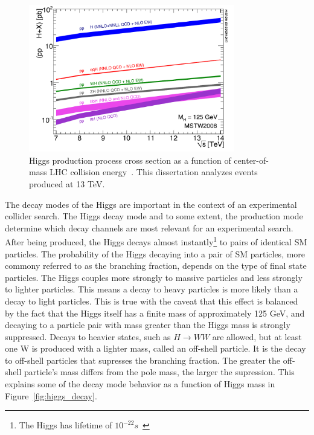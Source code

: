 \begin{figure}[hbtp]
 \begin{center}
   \includegraphics[width=0.8\textwidth]{ch2_figs/higgs_prod_xsec.pdf}
   \caption{Higgs production process cross section as a function of center-of-mass LHC collision energy~\cite{lhchxswg}.
     This dissertation analyzes events produced at 13 TeV.}
   \label{fig:higgs_prod_plot}
 \end{center}
\end{figure}


The decay modes of the Higgs are important in the context of an experimental collider search. The Higgs decay mode and to some extent, the production mode
determine which decay channels are most relevant for an experimental search. After being produced, the Higgs decays almost instantly\footnote{
The Higgs has lifetime of $10^{-22}s$~\cite{pdg}} to pairs of identical SM particles. The probability of the Higgs decaying into a pair of SM particles,
more commony referred to as the branching fraction, depends
on the type of final state particles. The Higgs couples more strongly to massive particles and less strongly to lighter particles. This means a decay to heavy
particles is more likely than a decay to light particles. This is true with the caveat that this effect is balanced by the fact that the Higgs itself has a
finite mass of approximately 125 GeV, and decaying to a particle pair with mass greater than the Higgs mass is strongly suppressed. Decays to heavier
states, such as $H\rightarrow WW$ are allowed, but at least one W is produced with a lighter mass, called an off-shell particle. It is the decay to off-shell
particles that supresses the branching fraction. The greater the off-shell particle's mass differs from the pole mass, the larger the supression.
This explains some of the decay mode behavior as a function of Higgs mass in
Figure~\ref{fig:higgs_decay}.

